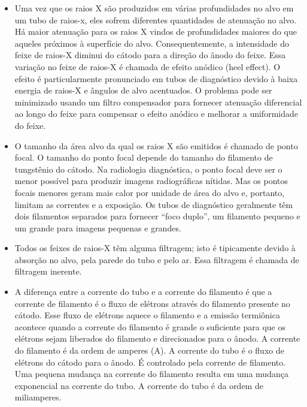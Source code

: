 \documentclass[11pt,a4paper]{article}
\newcounter{exemplo}
\begin{document}
\begin{exemplo}
\begin{itemize}
		\item Uma vez que os raios X são produzidos em várias profundidades no alvo em um tubo de raios-x, eles sofrem diferentes quantidades de atenuação no alvo. Há maior atenuação para os raios X vindos de profundidades maiores do que aqueles próximos à superfície do alvo. Consequentemente, a intensidade do feixe de raios-X diminui do cátodo para a direção do ânodo do feixe. Essa variação no feixe de raios-X é chamada de efeito anódico (heel effect). O efeito é particularmente pronunciado em tubos de diagnóstico devido à baixa energia de raios-X e ângulos de alvo acentuados. O problema pode ser minimizado usando um filtro compensador para fornecer atenuação diferencial ao longo do feixe para compensar o efeito anódico e melhorar a uniformidade do feixe.
		
		\item O tamanho da área alvo da qual os raios X são emitidos é chamado de ponto focal. O tamanho do ponto focal depende do tamanho do filamento de tungstênio do cátodo. Na radiologia diagnóstica, o ponto focal deve ser o menor possível para produzir imagens radiográficas nítidas. Mas os pontos focais menores geram mais calor por unidade de área do alvo e, portanto, limitam as correntes e a exposição. Os tubos de diagnóstico geralmente têm dois filamentos separados para fornecer “foco duplo”, um filamento pequeno e um grande para imagens pequenas e grandes.
		
		\item Todos os feixes de raios-X têm alguma filtragem; isto é tipicamente devido à absorção no alvo, pela parede do tubo e pelo ar. Essa filtragem é chamada de filtragem inerente.
		
		\item A diferença entre a corrente do tubo e a corrente do filamento é que a corrente de filamento é o fluxo de elétrons através do filamento presente no cátodo. Esse fluxo de elétrons aquece o filamento e a emissão termiônica acontece quando a corrente do filamento é grande o suficiente para que os elétrons sejam liberados do filamento e direcionados para o ânodo. A corrente do filamento é da ordem de amperes (A). A corrente do tubo é o fluxo de elétrons do cátodo para o ânodo. É controlado pela corrente de filamento. Uma pequena mudança na corrente do filamento resulta em uma mudança exponencial na corrente do tubo. A corrente do tubo é da ordem de miliamperes.
    \end{itemize}


\end{exemplo}
\end{document}
